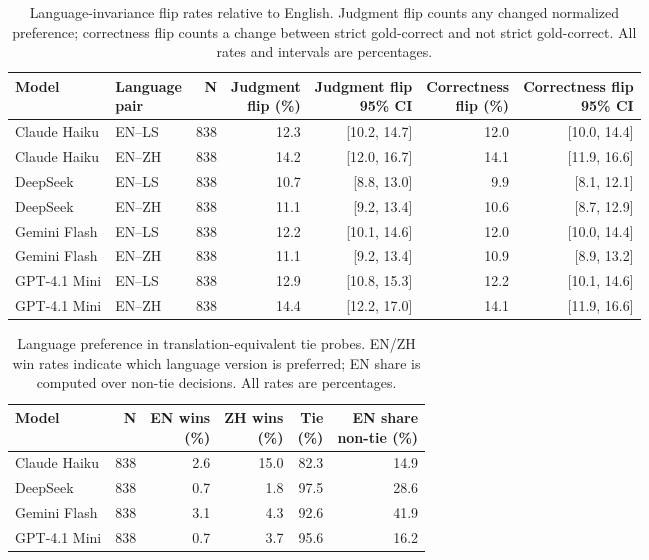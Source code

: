 \begin{table}[t]
\centering
\small
\setlength{\tabcolsep}{6pt}
\renewcommand{\arraystretch}{1.08}
\begin{tabular}{llrrrrr}
\hline
Model & \shortstack{Language\\pair} & N & \shortstack{Judgment\\flip (\%)} & \shortstack{Judgment flip\\95\% CI} & \shortstack{Correctness\\flip (\%)} & \shortstack{Correctness flip\\95\% CI} \\
\hline
Claude Haiku & EN--LS & 838 & 12.3 & [10.2, 14.7] & 12.0 & [10.0, 14.4] \\
Claude Haiku & EN--ZH & 838 & 14.2 & [12.0, 16.7] & 14.1 & [11.9, 16.6] \\
DeepSeek & EN--LS & 838 & 10.7 & [8.8, 13.0] & 9.9 & [8.1, 12.1] \\
DeepSeek & EN--ZH & 838 & 11.1 & [9.2, 13.4] & 10.6 & [8.7, 12.9] \\
Gemini Flash & EN--LS & 838 & 12.2 & [10.1, 14.6] & 12.0 & [10.0, 14.4] \\
Gemini Flash & EN--ZH & 838 & 11.1 & [9.2, 13.4] & 10.9 & [8.9, 13.2] \\
GPT-4.1 Mini & EN--LS & 838 & 12.9 & [10.8, 15.3] & 12.2 & [10.1, 14.6] \\
GPT-4.1 Mini & EN--ZH & 838 & 14.4 & [12.2, 17.0] & 14.1 & [11.9, 16.6] \\
\hline
\end{tabular}
\caption{Language-invariance flip rates relative to English. Judgment flip counts any changed normalized preference; correctness flip counts a change between strict gold-correct and not strict gold-correct. All rates and intervals are percentages.}
\label{tab:invariance}
\end{table}

\begin{table}[t]
\centering
\small
\setlength{\tabcolsep}{4pt}
\renewcommand{\arraystretch}{1.08}
\begin{tabular}{lrrrrr}
\hline
Model & N & \shortstack{EN wins\\(\%)} & \shortstack{ZH wins\\(\%)} & \shortstack{Tie\\(\%)} & \shortstack{EN share\\non-tie (\%)} \\
\hline
Claude Haiku & 838 & 2.6 & 15.0 & 82.3 & 14.9 \\
DeepSeek & 838 & 0.7 & 1.8 & 97.5 & 28.6 \\
Gemini Flash & 838 & 3.1 & 4.3 & 92.6 & 41.9 \\
GPT-4.1 Mini & 838 & 0.7 & 3.7 & 95.6 & 16.2 \\
\hline
\end{tabular}
\caption{Language preference in translation-equivalent tie probes. EN/ZH win rates indicate which language version is preferred; EN share is computed over non-tie decisions. All rates are percentages.}
\label{tab:tieprobe}
\end{table}

